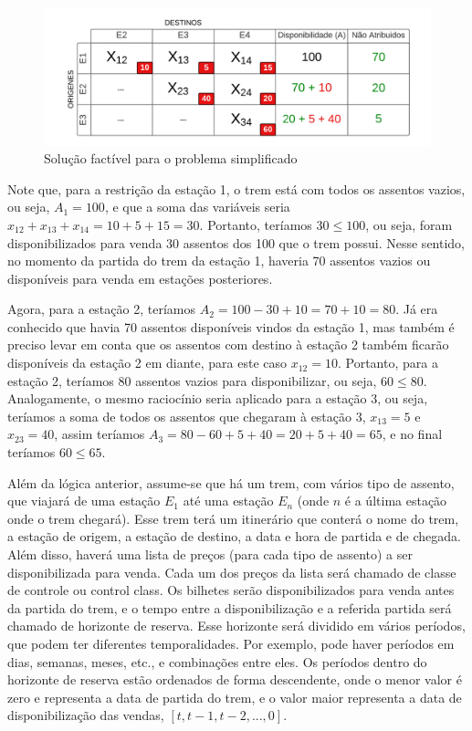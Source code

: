 \begin{figure}[!ht]
	\begin{center}
		\includegraphics[scale=0.4]{img/fig2.png}
		\caption{Solução factível para o problema simplificado}
		\label{fig: fig2}
	\end{center}
\end{figure}

Note que, para a restrição da estação 1, o trem está com todos os assentos vazios, ou seja, \(A_1=100\), e que a soma das variáveis seria \(x_{12} + x_{13} + x_{14} = 10 + 5 + 15 = 30\). Portanto, teríamos \(30 \leq 100\), ou seja, foram disponibilizados para venda 30 assentos dos 100 que o trem possui. Nesse sentido, no momento da partida do trem da estação 1, haveria 70 assentos vazios ou disponíveis para venda em estações posteriores.

Agora, para a estação 2, teríamos \(A_2 = 100 - 30 + 10 = 70 + 10 = 80\). Já era conhecido que havia 70 assentos disponíveis vindos da estação 1, mas também é preciso levar em conta que os assentos com destino à estação 2 também ficarão disponíveis da estação 2 em diante, para este caso \(x_{12} = 10\). Portanto, para a estação 2, teríamos 80 assentos vazios para disponibilizar, ou seja, \(60 \leq 80\). Analogamente, o mesmo raciocínio seria aplicado para a estação 3, ou seja, teríamos a soma de todos os assentos que chegaram à estação 3, \(x_{13} = 5\) e \(x_{23} = 40\), assim teríamos \(A_3 = 80 - 60 + 5 + 40 = 20 + 5 + 40 = 65\), e no final teríamos \(60 \leq 65\).

Além da lógica anterior, assume-se que há um trem, com vários tipo de assento, que viajará de uma estação $E_1$ até uma estação $E_n$ (onde $n$ é a última estação onde o trem chegará). Esse trem terá um itinerário que conterá o nome do trem, a estação de origem, a estação de destino, a data e hora de partida e de chegada. Além disso, haverá uma lista de preços (para cada tipo de assento) a ser disponibilizada para venda. Cada um dos preços da lista será chamado de classe de controle ou control class. Os bilhetes serão disponibilizados para venda antes da partida do trem, e o tempo entre a disponibilização e a referida partida será chamado de horizonte de reserva. Esse horizonte será dividido em vários períodos, que podem ter diferentes temporalidades. Por exemplo, pode haver períodos em dias, semanas, meses, etc., e combinações entre eles. Os períodos dentro do horizonte de reserva estão ordenados de forma descendente, onde o menor valor é zero e representa a data de partida do trem, e o valor maior representa a data de disponibilização das vendas, $[ t,t-1,t-2,...,0]$.

